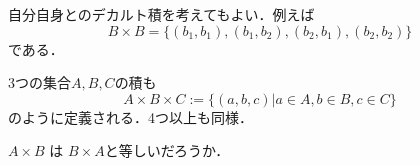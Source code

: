 \documentclass[11pt,a4paper]{jsarticle}
\begin{document}
自分自身とのデカルト積を考えてもよい．例えば
\[
B \times B = \{(b_1, b_1), (b_1, b_2), (b_2, b_1), (b_2, b_2)\}
\]
である．

3つの集合$A, B, C$の積も
\[
 A \times B \times C := \{ (a, b, c) | a \in A, b \in B, c \in C \}
\]
のように定義される．4つ以上も同様．


\begin{exercise}
$A \times B$ は $B \times A$と等しいだろうか．
\end{exercise} 

%



%
\end{document}
